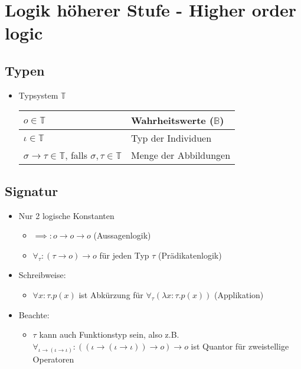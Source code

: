 \documentclass{scrartcl}
\begin{document}
\section{Logik höherer Stufe - Higher order logic}

\subsection{Typen}

\begin{itemize}
	\item Typsystem $ \mathbb{T} $ \\
	\renewcommand{\arraystretch}{2}
	\begin{tabular}{l|l}
		$ o \in \mathbb{T} $ & Wahrheitswerte ($ \mathbb{B} $) \\ 
		\hline 
		$ \iota \in \mathbb{T} $ & Typ der Individuen \\ 
		\hline 
		$ \sigma \rightarrow \tau \in \mathbb{T} $, falls $ \sigma, \tau \in \mathbb{T} $ & Menge der Abbildungen
	\end{tabular} 
\end{itemize}

\subsection{Signatur}

\begin{itemize}
	\item Nur 2 logische Konstanten
	\begin{itemize}
		\item $ \implies : o \rightarrow o \rightarrow o $ (Aussagenlogik)
		\item $ \forall_\tau : (\tau \rightarrow o) \rightarrow o $ für jeden Typ $ \tau $ (Prädikatenlogik)
	\end{itemize}
	\item Schreibweise:
	\begin{itemize}
		\item $ \forall x : \tau .p(x) $ ist Abkürzung für $ \forall_\tau(\lambda x : \tau .p(x)) $ (Applikation)
	\end{itemize}
	\item Beachte:
	\begin{itemize}
		\item $ \tau $ kann auch Funktionstyp sein, also z.B. $ \forall_{\iota \rightarrow (\iota \rightarrow \iota)} : ((\iota \rightarrow (\iota \rightarrow \iota)) \rightarrow o) \rightarrow o $ ist Quantor für zweistellige Operatoren
	\end{itemize}
\end{itemize}
\end{document}
